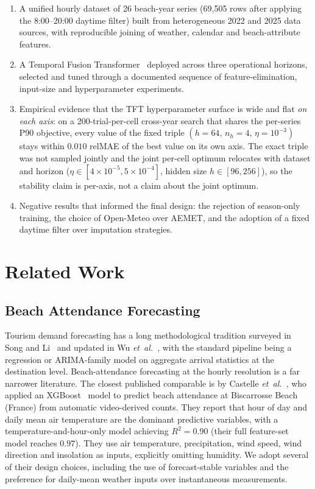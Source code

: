 \documentclass[twocolumn,twoside,a4paper,10pt]{IEEEtran}
\begin{document}
\begin{enumerate}
    \item A unified hourly dataset of 26 beach-year series (69{,}505 rows after applying the 8:00--20:00 daytime filter) built from heterogeneous 2022 and 2025 data sources, with reproducible joining of weather, calendar and beach-attribute features.
    \item A Temporal Fusion Transformer~\cite{LimTFT2021} deployed across three operational horizons, selected and tuned through a documented sequence of feature-elimination, input-size and hyperparameter experiments.
    \item Empirical evidence that the TFT hyperparameter surface is wide and flat \emph{on each axis}: on a 200-trial-per-cell cross-year search that shares the per-series P90 objective, every value of the fixed triple $(h{=}64,\,n_h{=}4,\,\eta{=}10^{-3})$ stays within $0.010$ relMAE of the best value on its own axis. The exact triple was not sampled jointly and the joint per-cell optimum relocates with dataset and horizon ($\eta \in [4\!\times\!10^{-5}, 5\!\times\!10^{-4}]$, hidden size $h \in [96, 256]$), so the stability claim is per-axis, not a claim about the joint optimum.
    \item Negative results that informed the final design: the rejection of season-only training, the choice of Open-Meteo over AEMET, and the adoption of a fixed daytime filter over imputation strategies.
\end{enumerate}



\section{Related Work}

\subsection{Beach Attendance Forecasting}

Tourism demand forecasting has a long methodological tradition surveyed in Song and Li~\cite{Song2008TourismDemand} and updated in Wu \emph{et~al.}~\cite{Wu2017TourismReview}, with the standard pipeline being a regression or ARIMA-family model on aggregate arrival statistics at the destination level. Beach-attendance forecasting at the hourly resolution is a far narrower literature. The closest published comparable is by Castelle \emph{et~al.}~\cite{Castelle2025}, who applied an XGBoost~\cite{Chen2016XGBoost} model to predict beach attendance at Biscarrosse Beach (France) from automatic video-derived counts. They report that hour of day and daily mean air temperature are the dominant predictive variables, with a temperature-and-hour-only model achieving $R^2{=}0.90$ (their full feature-set model reaches $0.97$). They use air temperature, precipitation, wind speed, wind direction and insolation as inputs, explicitly omitting humidity. We adopt several of their design choices, including the use of forecast-stable variables and the preference for daily-mean weather inputs over instantaneous measurements.
\end{document}
